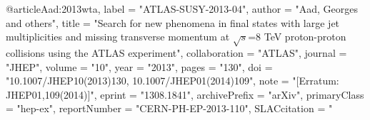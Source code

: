 @article{Aad:2013wta,
      label          = "ATLAS-SUSY-2013-04",
      author         = "Aad, Georges and others",
      title          = "{Search for new phenomena in final states with large jet
                        multiplicities and missing transverse momentum at
                        $\sqrt{s}$=8 TeV proton-proton collisions using the ATLAS
                        experiment}",
      collaboration  = "ATLAS",
      journal        = "JHEP",
      volume         = "10",
      year           = "2013",
      pages          = "130",
      doi            = "10.1007/JHEP10(2013)130, 10.1007/JHEP01(2014)109",
      note           = "[Erratum: JHEP01,109(2014)]",
      eprint         = "1308.1841",
      archivePrefix  = "arXiv",
      primaryClass   = "hep-ex",
      reportNumber   = "CERN-PH-EP-2013-110",
      SLACcitation   = "%
}

